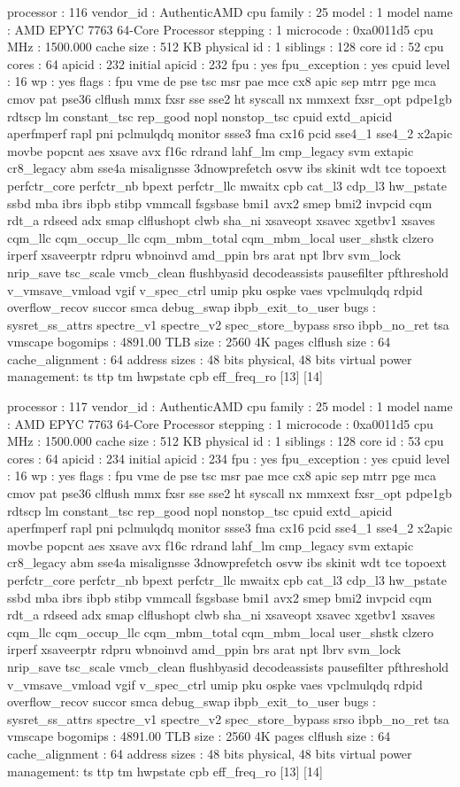 processor	: 116
vendor_id	: AuthenticAMD
cpu family	: 25
model		: 1
model name	: AMD EPYC 7763 64-Core Processor
stepping	: 1
microcode	: 0xa0011d5
cpu MHz		: 1500.000
cache size	: 512 KB
physical id	: 1
siblings	: 128
core id		: 52
cpu cores	: 64
apicid		: 232
initial apicid	: 232
fpu		: yes
fpu_exception	: yes
cpuid level	: 16
wp		: yes
flags		: fpu vme de pse tsc msr pae mce cx8 apic sep mtrr pge mca cmov pat pse36 clflush mmx fxsr sse sse2 ht syscall nx mmxext fxsr_opt pdpe1gb rdtscp lm constant_tsc rep_good nopl nonstop_tsc cpuid extd_apicid aperfmperf rapl pni pclmulqdq monitor ssse3 fma cx16 pcid sse4_1 sse4_2 x2apic movbe popcnt aes xsave avx f16c rdrand lahf_lm cmp_legacy svm extapic cr8_legacy abm sse4a misalignsse 3dnowprefetch osvw ibs skinit wdt tce topoext perfctr_core perfctr_nb bpext perfctr_llc mwaitx cpb cat_l3 cdp_l3 hw_pstate ssbd mba ibrs ibpb stibp vmmcall fsgsbase bmi1 avx2 smep bmi2 invpcid cqm rdt_a rdseed adx smap clflushopt clwb sha_ni xsaveopt xsavec xgetbv1 xsaves cqm_llc cqm_occup_llc cqm_mbm_total cqm_mbm_local user_shstk clzero irperf xsaveerptr rdpru wbnoinvd amd_ppin brs arat npt lbrv svm_lock nrip_save tsc_scale vmcb_clean flushbyasid decodeassists pausefilter pfthreshold v_vmsave_vmload vgif v_spec_ctrl umip pku ospke vaes vpclmulqdq rdpid overflow_recov succor smca debug_swap ibpb_exit_to_user
bugs		: sysret_ss_attrs spectre_v1 spectre_v2 spec_store_bypass srso ibpb_no_ret tsa vmscape
bogomips	: 4891.00
TLB size	: 2560 4K pages
clflush size	: 64
cache_alignment	: 64
address sizes	: 48 bits physical, 48 bits virtual
power management: ts ttp tm hwpstate cpb eff_freq_ro [13] [14]

processor	: 117
vendor_id	: AuthenticAMD
cpu family	: 25
model		: 1
model name	: AMD EPYC 7763 64-Core Processor
stepping	: 1
microcode	: 0xa0011d5
cpu MHz		: 1500.000
cache size	: 512 KB
physical id	: 1
siblings	: 128
core id		: 53
cpu cores	: 64
apicid		: 234
initial apicid	: 234
fpu		: yes
fpu_exception	: yes
cpuid level	: 16
wp		: yes
flags		: fpu vme de pse tsc msr pae mce cx8 apic sep mtrr pge mca cmov pat pse36 clflush mmx fxsr sse sse2 ht syscall nx mmxext fxsr_opt pdpe1gb rdtscp lm constant_tsc rep_good nopl nonstop_tsc cpuid extd_apicid aperfmperf rapl pni pclmulqdq monitor ssse3 fma cx16 pcid sse4_1 sse4_2 x2apic movbe popcnt aes xsave avx f16c rdrand lahf_lm cmp_legacy svm extapic cr8_legacy abm sse4a misalignsse 3dnowprefetch osvw ibs skinit wdt tce topoext perfctr_core perfctr_nb bpext perfctr_llc mwaitx cpb cat_l3 cdp_l3 hw_pstate ssbd mba ibrs ibpb stibp vmmcall fsgsbase bmi1 avx2 smep bmi2 invpcid cqm rdt_a rdseed adx smap clflushopt clwb sha_ni xsaveopt xsavec xgetbv1 xsaves cqm_llc cqm_occup_llc cqm_mbm_total cqm_mbm_local user_shstk clzero irperf xsaveerptr rdpru wbnoinvd amd_ppin brs arat npt lbrv svm_lock nrip_save tsc_scale vmcb_clean flushbyasid decodeassists pausefilter pfthreshold v_vmsave_vmload vgif v_spec_ctrl umip pku ospke vaes vpclmulqdq rdpid overflow_recov succor smca debug_swap ibpb_exit_to_user
bugs		: sysret_ss_attrs spectre_v1 spectre_v2 spec_store_bypass srso ibpb_no_ret tsa vmscape
bogomips	: 4891.00
TLB size	: 2560 4K pages
clflush size	: 64
cache_alignment	: 64
address sizes	: 48 bits physical, 48 bits virtual
power management: ts ttp tm hwpstate cpb eff_freq_ro [13] [14]

